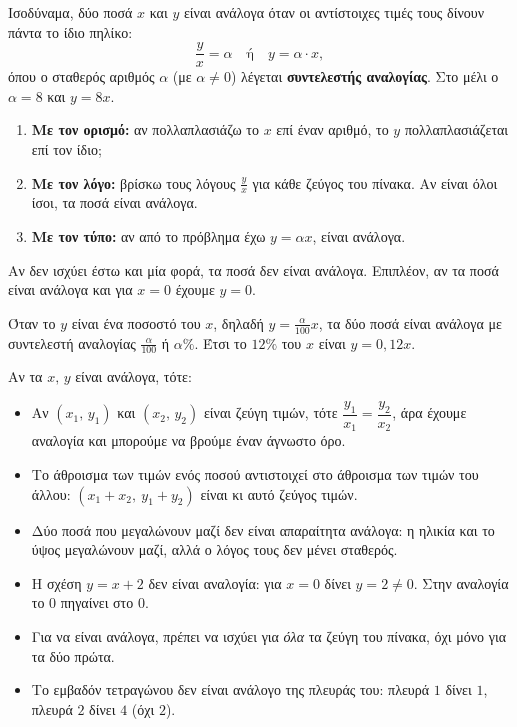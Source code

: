 Ισοδύναμα, δύο ποσά $x$ και $y$ είναι ανάλογα όταν οι αντίστοιχες τιμές τους δίνουν πάντα το ίδιο πηλίκο:
$$\dfrac{y}{x}=\alpha\quad\text{ή}\quad y=\alpha\cdot x,$$
όπου ο σταθερός αριθμός $\alpha$ (με $\alpha\neq0$) λέγεται \textbf{συντελεστής αναλογίας}. Στο μέλι ο $\alpha=8$ και $y=8x$.


\begin{enumerate}[leftmargin=1.6em,itemsep=0.3ex,topsep=2pt]
\item \textbf{Με τον ορισμό:} αν πολλαπλασιάζω το $x$ επί έναν αριθμό, το $y$ πολλαπλασιάζεται επί τον ίδιο;
\item \textbf{Με τον λόγο:} βρίσκω τους λόγους $\frac{y}{x}$ για κάθε ζεύγος του πίνακα. Αν είναι όλοι ίσοι, τα ποσά είναι ανάλογα.
\item \textbf{Με τον τύπο:} αν από το πρόβλημα έχω $y=\alpha x$, είναι ανάλογα.
\end{enumerate}

Αν δεν ισχύει έστω και μία φορά, τα ποσά δεν είναι ανάλογα. Επιπλέον, αν τα ποσά είναι ανάλογα και για $x=0$ έχουμε $y=0$.


Όταν το $y$ είναι ένα ποσοστό του $x$, δηλαδή $y=\frac{\alpha}{100}x$, τα δύο ποσά είναι ανάλογα με συντελεστή αναλογίας $\frac{\alpha}{100}$ ή $\alpha\%$. Έτσι το $12\%$ του $x$ είναι $y=0{,}12x$.


Αν τα $x,\,y$ είναι ανάλογα, τότε:
\begin{itemize}[leftmargin=1.2em,itemsep=0.3ex,topsep=2pt]
\item Αν $(x_1,\,y_1)$ και $(x_2,\,y_2)$ είναι ζεύγη τιμών, τότε $\dfrac{y_1}{x_1}=\dfrac{y_2}{x_2}$, άρα έχουμε αναλογία και μπορούμε να βρούμε έναν άγνωστο όρο.
\item Το άθροισμα των τιμών ενός ποσού αντιστοιχεί στο άθροισμα των τιμών του άλλου: $(x_1+x_2,\ y_1+y_2)$ είναι κι αυτό ζεύγος τιμών.
\end{itemize}

\begin{prosoxi}
\begin{itemize}[leftmargin=1.2em,itemsep=0.3ex,topsep=2pt]
\item Δύο ποσά που μεγαλώνουν μαζί δεν είναι απαραίτητα ανάλογα: η ηλικία και το ύψος μεγαλώνουν μαζί, αλλά ο λόγος τους δεν μένει σταθερός.
\item Η σχέση $y=x+2$ δεν είναι αναλογία: για $x=0$ δίνει $y=2\neq0$. Στην αναλογία το $0$ πηγαίνει στο $0$.
\item Για να είναι ανάλογα, πρέπει να ισχύει για \emph{όλα} τα ζεύγη του πίνακα, όχι μόνο για τα δύο πρώτα.
\item Το εμβαδόν τετραγώνου δεν είναι ανάλογο της πλευράς του: πλευρά $1$ δίνει $1$, πλευρά $2$ δίνει $4$ (όχι $2$).
\end{itemize}
\end{prosoxi}

